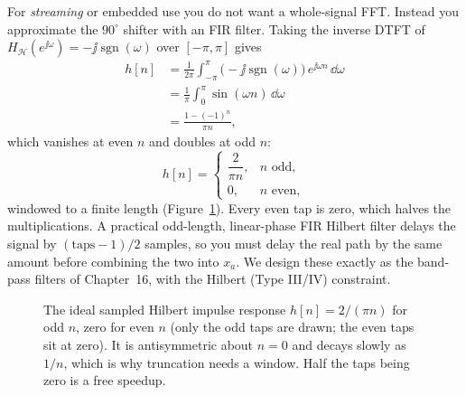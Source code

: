 For \emph{streaming} or embedded use you do not want a whole-signal FFT. Instead you
approximate the $90^\circ$ shifter with an FIR filter. Taking the inverse DTFT of $H_{\mathcal H}(e^{\jj\omega}) = -\jj\operatorname{sgn}(\omega)$ over $[-\pi,\pi]$ gives
\begin{align*}
h[n] &= \frac{1}{2\pi}\int_{-\pi}^{\pi}\bigl(-\jj\operatorname{sgn}(\omega)\bigr)\,e^{\jj\omega n}\,\dd\omega \\
     &= \frac{1}{\pi}\int_0^\pi \sin(\omega n)\,\dd\omega \\
     &= \frac{1 - (-1)^n}{\pi n},
\end{align*}
which vanishes at even $n$ and doubles at odd $n$:
\begin{equation}
\label{ch25:fir}
h[n] = \begin{cases}
\dfrac{2}{\pi n}, & n \text{ odd},\\[1.2ex]
0, & n \text{ even},
\end{cases}
\end{equation}
windowed to a finite length (Figure~\ref{ch25:fig-fir}). Every even tap is zero,
which halves the multiplications. A practical odd-length, linear-phase FIR Hilbert filter
delays the signal by $(\text{taps}-1)/2$ samples, so you must delay the real path by the
same amount before combining the two into $x_a$. We design these exactly as the band-pass
filters of Chapter~16, with the Hilbert (Type III/IV) constraint.

\begin{figure}[H]
\centering
{}
\caption{The ideal sampled Hilbert impulse response $h[n]=2/(\pi n)$ for odd $n$, zero for
even $n$ (only the odd taps are drawn; the even taps sit at zero). It is antisymmetric
about $n=0$ and decays slowly as $1/n$, which is why truncation needs a window. Half the
taps being zero is a free speedup.}
\label{ch25:fig-fir}
\end{figure}

